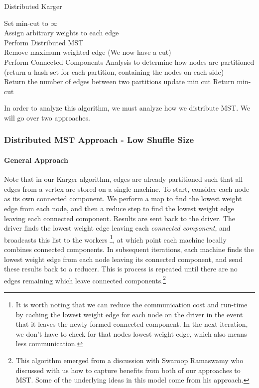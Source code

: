 \documentclass{article}
\begin{document}
\LinesNumbered
\begin{algorithm}[H]
\caption{Distributed Karger}
Set min-cut to $\infty$ \\
 {
  Assign arbitrary weights to each edge \\
  Perform Distributed MST \\
  Remove maximum weighted edge (We now have a cut) \\
  Perform Connected Components Analysis to determine how nodes are partitioned (return a hash set for each partition, containing the nodes on each side) \\
  \Reduce{} {
    Return the number of edges between two partitions
  }
   {
    update min cut
  }
}
Return min-cut
\end{algorithm}

In order to analyze this algorithm, we must analyze how we distribute MST. We will go over two approaches.

\subsubsection{Distributed MST Approach - Low Shuffle Size}

\paragraph{General Approach}
Note that in our Karger algorithm, edges are already partitioned such that all edges from a vertex are stored on a single machine. To start, consider each node as its own connected component. We perform a map to find the lowest weight edge from each node, and then a reduce step to find the lowest weight edge leaving each connected component. Results are sent back to the driver. The driver finds the lowest weight edge leaving each \emph{connected component}, and broadcasts this list to the workers \footnote{It is worth noting that we can reduce the communication cost and run-time by caching the lowest weight edge for each node on the driver in the event that it leaves the newly formed connected component. In the next iteration, we don't have to check for that nodes lowest weight edge, which also means less communication.
}, at which point each machine locally combines connected components. In subsequent iterations, each machine finds the lowest weight edge from each node leaving its connected component, and send these results back to a reducer. This is process is repeated until there are no edges remaining which leave connected components.\footnote{This algorithm emerged from a discussion with Swaroop Ramaswamy who discussed with us how to capture benefits from both of our approaches to MST. Some of the underlying ideas in this model come from his approach.}
\end{document}
